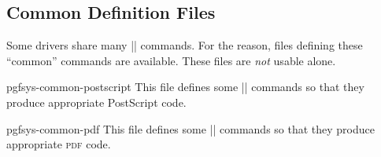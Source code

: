 \subsection{Common Definition Files}

Some drivers share many |\pgfsys@| commands. For the reason, files
defining these ``common'' commands are available. These files are
\emph{not} usable alone.

\begin{filedescription}{pgfsys-common-postscript}
  This file defines some |\pgfsys@| commands so that they produce
  appropriate PostScript code.
\end{filedescription}

\begin{filedescription}{pgfsys-common-pdf}
  This file defines some |\pgfsys@| commands so that they produce
  appropriate \textsc{pdf} code.
\end{filedescription}


